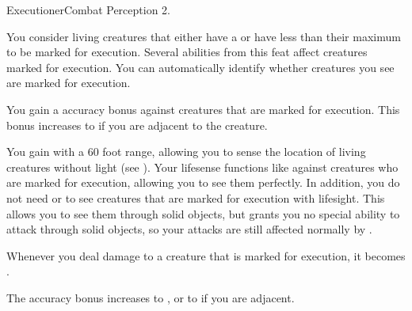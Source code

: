   \begin{feat}{Executioner}{Combat}
    \featpres Perception 2.

     You consider living creatures that either have a  or have less than their maximum  to be marked for execution.
    Several abilities from this feat affect creatures marked for execution.
    You can automatically identify whether creatures you see are marked for execution.

     You gain a  accuracy bonus against creatures that are marked for execution.
    This bonus increases to  if you are adjacent to the creature.

     You gain  with a 60 foot range, allowing you to sense the location of living creatures without light (see ).
    Your lifesense functions like  against creatures who are marked for execution, allowing you to see them perfectly.
    In addition, you do not need  or  to see creatures that are marked for execution with lifesight.
    This allows you to see them through solid objects, but grants you no special ability to attack through solid objects, so your attacks are still affected normally by .

     Whenever you deal damage to a creature that is marked for execution, it  becomes \slowed.

     The accuracy bonus increases to , or to  if you are adjacent.
  \end{feat}

